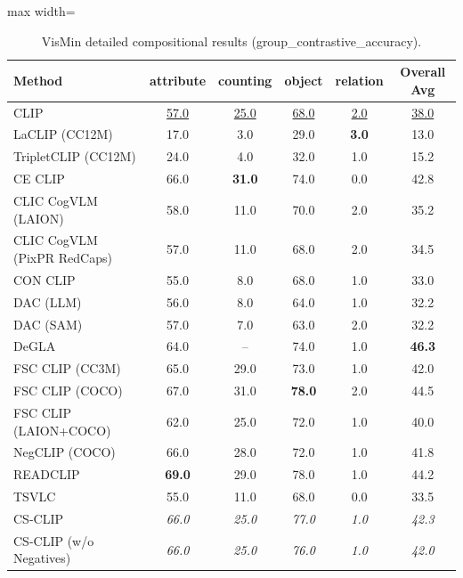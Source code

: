 \begin{table}[t]
  \centering
  \scriptsize
  \caption{VisMin detailed compositional results (group_contrastive_accuracy).}
  \label{tab:VisMin_detailed}
  \begin{adjustbox}{max width=\textwidth}
  \setlength{\tabcolsep}{2pt}
  \begin{tabular}{p{5cm}c|c|c|c|c}
    \toprule
    Method & attribute & counting & object & relation & Overall Avg \\
    \midrule
    CLIP & \underline{57.0} & \underline{25.0} & \underline{68.0} & \underline{2.0} & \underline{38.0} \\
    \midrule
    LaCLIP (CC12M) & 17.0 & 3.0 & 29.0 & \textbf{3.0} & 13.0 \\
    TripletCLIP (CC12M) & 24.0 & 4.0 & 32.0 & 1.0 & 15.2 \\
    \midrule
    CE CLIP & 66.0 & \textbf{31.0} & 74.0 & 0.0 & 42.8 \\
    CLIC CogVLM (LAION) & 58.0 & 11.0 & 70.0 & 2.0 & 35.2 \\
    CLIC CogVLM (PixPR RedCaps) & 57.0 & 11.0 & 68.0 & 2.0 & 34.5 \\
    CON CLIP & 55.0 & 8.0 & 68.0 & 1.0 & 33.0 \\
    DAC (LLM) & 56.0 & 8.0 & 64.0 & 1.0 & 32.2 \\
    DAC (SAM) & 57.0 & 7.0 & 63.0 & 2.0 & 32.2 \\
    DeGLA & 64.0 & -- & 74.0 & 1.0 & \textbf{46.3} \\
    FSC CLIP (CC3M) & 65.0 & 29.0 & 73.0 & 1.0 & 42.0 \\
    FSC CLIP (COCO) & 67.0 & 31.0 & \textbf{78.0} & 2.0 & 44.5 \\
    FSC CLIP (LAION+COCO) & 62.0 & 25.0 & 72.0 & 1.0 & 40.0 \\
    NegCLIP (COCO) & 66.0 & 28.0 & 72.0 & 1.0 & 41.8 \\
    READCLIP & \textbf{69.0} & 29.0 & 78.0 & 1.0 & 44.2 \\
    TSVLC & 55.0 & 11.0 & 68.0 & 0.0 & 33.5 \\
    \midrule
    CS-CLIP & \emph{66.0} & \emph{25.0} & \emph{77.0} & \emph{1.0} & \emph{42.3} \\
    CS-CLIP (w/o Negatives) & \emph{66.0} & \emph{25.0} & \emph{76.0} & \emph{1.0} & \emph{42.0} \\
    \bottomrule
  \end{tabular}
  \end{adjustbox}
\end{table}

